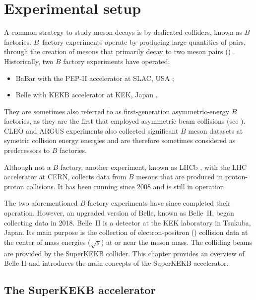 \chapter{Experimental setup}\label{ch:belle2}

A common strategy to study \B meson decays is by dedicated colliders, known as $B$ factories.
$B$~factory experiments operate by producing large quantities of \BB pairs, through the creation of \FourS mesons that primarily decay to two \B meson pairs (\BB) \cite{Workman:2022ynf}.
Historically, two $B$ factory experiments have operated:
\begin{itemize}
    \item BaBar with the PEP-II accelerator at SLAC, USA \cite{BaBar:1995bns};
    \item Belle with KEKB accelerator at KEK, Japan \cite{Belle:2000cnh}.
\end{itemize}
They are sometimes also referred to as first-generation asymmetric-energy $B$ factories, as they are the first that employed asymmetric beam collisions (see ).
CLEO \cite{CLEO:1982pvq} and ARGUS \cite{ARGUS:1988bds} experiments also collected significant $B$ meson datasets at symetric \epem collision energy \FourS energies and are therefore sometimes considered as predecessors to $B$ factories. 

Although not a $B$ factory, another experiment, known as LHCb \cite{LHCb:2008vvz}, with the LHC accelerator at CERN, collects data from $B$ mesons that are produced in proton-proton collisions.
It has been running since 2008 and is still in operation.

The two aforementioned $B$ factory experiments have since completed their operation.
However, an upgraded version of Belle, known as Belle~II, began collecting data in 2018.
Belle~II is a detector at the KEK laboratory in Tsukuba, Japan.
Its main purpose is the collection of electron-positron (\epem) collision data 
at the center of mass energies ($\sqrt{s}$) at or near the \FourS meson mass.
The colliding beams are provided by the SuperKEKB \epem collider.
This chapter provides an overview of Belle II and introduces the main concepts of the SuperKEKB accelerator.

\section{The SuperKEKB accelerator}\label{sec:superkekb}

